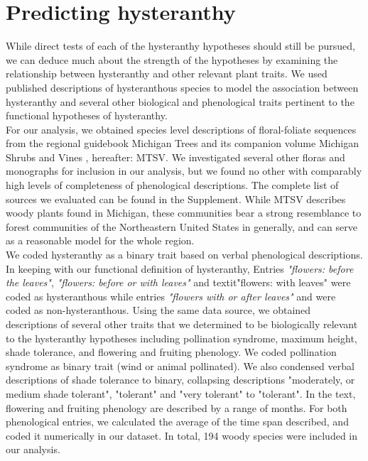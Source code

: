\documentclass{article}
\begin{document}
\section*{Predicting hysteranthy}
\indent While direct tests of each of the hysteranthy hypotheses should still be pursued, we can deduce much about the strength of the hypotheses by examining the relationship between hysteranthy and other relevant plant traits. We used published descriptions of hysteranthous species to model the association between hysteranthy and several other biological and phenological traits pertinent to the functional hypotheses of hysteranthy.\\
\indent For our analysis, we obtained species level descriptions of floral-foliate sequences from the regional guidebook Michigan Trees \citep{Barnes2004} and its companion volume Michigan Shrubs and Vines \citep{Barnes2016}, hereafter: MTSV. We investigated several other floras and monographs for inclusion in our analysis, but we found no other with comparably high levels of completeness of phenological descriptions. The complete list of sources we evaluated can be found in the Supplement. While MTSV describes woody plants found in Michigan, these communities bear a strong resemblance to forest communities of the Northeastern United States in generally, and can serve as a reasonable model for the whole region. \\
\indent We coded hysteranthy as a binary trait based on verbal phenological descriptions. In keeping with our functional definition of hysteranthy, Entries \textit{"flowers: before the leaves"}, \textit{"flowers: before or with leaves"} and textit{"flowers: with leaves"} were coded as hysteranthous while entries \textit{"flowers with or after leaves"} and  were coded as non-hysteranthous. Using the same data source, we obtained descriptions of several other traits that we determined to be biologically relevant to the hysteranthy hypotheses including pollination syndrome, maximum height, shade tolerance, and flowering and fruiting phenology. We coded pollination syndrome as binary trait (wind or animal pollinated). We also condensed verbal descriptions of shade tolerance to binary, collapsing descriptions "moderately, or medium shade tolerant", "tolerant" and "very tolerant" to "tolerant". In the text, flowering and fruiting phenology are described by a range of months. For both phenological entries, we calculated the average of the time span described, and coded it numerically in our dataset. In total, 194 woody species were included in our analysis. \\
\end{document}
